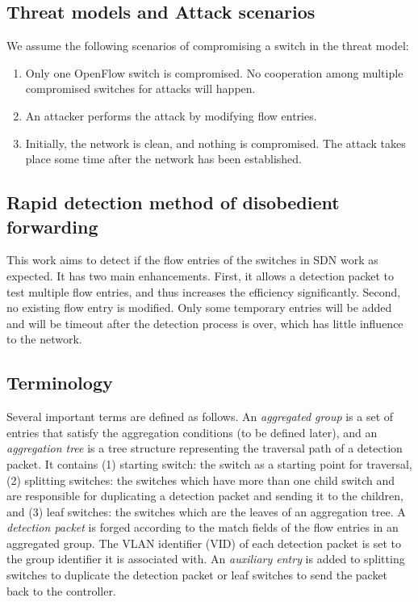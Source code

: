 \documentclass[conference]{IEEEtran}
\begin{document}
\subsection{Threat models and Attack scenarios}
We assume the following scenarios of compromising a switch in the threat model:
\begin{enumerate}
\item
Only one OpenFlow switch is compromised. No cooperation among multiple compromised switches for attacks will happen.
\item
An attacker performs the attack by modifying flow entries.
\item
Initially, the network is clean, and nothing is compromised. The attack takes place some time after the network has been established.
\end{enumerate}

\subsection{Rapid detection method of disobedient forwarding}
This work aims to detect if the flow entries of the switches in SDN work as expected. It has two main enhancements. First, it allows a detection packet to test multiple flow entries, and thus increases the efficiency significantly. Second, no existing flow entry is modified. Only some temporary entries will be added and will be timeout after the detection process is over, which has little influence to the network. 

\subsection{Terminology}
Several important terms are defined as follows. An \textit{aggregated group} is a set of entries that satisfy the aggregation conditions (to be defined later), and an \textit{aggregation tree} is a tree structure representing the traversal path of a detection packet. It contains (1) starting switch: the switch as a starting point for traversal, (2) splitting switches: the switches which have more than one child switch and are responsible for duplicating a detection packet and sending it to the children, and (3) leaf switches: the switches which are the leaves of an aggregation tree. A \textit{detection packet} is forged according to the match fields of the flow entries in an aggregated group. The VLAN identifier (VID) of each detection packet is set to the group identifier it is associated with. An \textit{auxiliary entry} is added to splitting switches to duplicate the detection packet or leaf switches to send the packet back to the controller.
\end{document}
